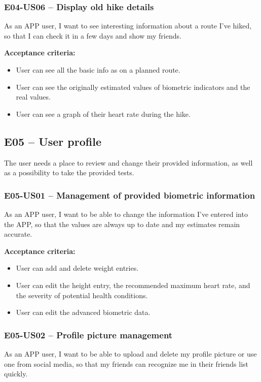 \subsubsection*{E04-US06 -- Display old hike details}
As an APP user, I want to see interesting information about a route I've hiked, so that I can check it in a few days and show my friends.

\textbf{Acceptance criteria:}
\begin{itemize}
    \item User can see all the basic info as on a planned route.
    \item User can see the originally estimated values of biometric indicators and the real values.
    \item User can see a graph of their heart rate during the hike.
\end{itemize}


\subsection*{E05 -- User profile}
The user needs a place to review and change their provided information, as well as a possibility to take the provided tests.

\subsubsection*{E05-US01 -- Management of provided biometric information}
As an APP user, I want to be able to change the information I've entered into the APP, so that the values are always up to date and my estimates remain accurate.

\textbf{Acceptance criteria:}
\begin{itemize}
    \item User can add and delete weight entries.
    \item User can edit the height entry, the recommended maximum heart rate, and the severity of potential health conditions.
    \item User can edit the advanced biometric data.
\end{itemize}

\subsubsection*{E05-US02 -- Profile picture management}
As an APP user, I want to be able to upload and delete my profile picture or use one from social media, so that my friends can recognize me in their friends list quickly.

